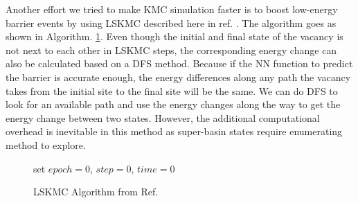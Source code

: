 Another effort we tried to make \ac{KMC} simulation faster is to boost low-energy barrier events by using \acf{LSKMC} described here in ref. \cite{fichthorn2013local}. The algorithm goes as shown in Algorithm. \ref{algo:lskmc}. Even though the initial and final state of the vacancy is not next to each other in \ac{LSKMC} steps, the corresponding energy change can also be calculated based on a \ac{DFS} method. Because if the \ac{NN} function to predict the barrier is accurate enough, the energy differences along any path the vacancy takes from the initial site to the final site will be the same. We can do \ac{DFS} to look for an available path and use the energy changes along the way to get the energy change between two states. However, the additional computational overhead is inevitable in this method as super-basin states require enumerating method to explore. 

\begin{figure}[!htb]
  \centering
  \begin{minipage}{.75\linewidth}
    \begin{algorithm}[H]
      \caption{\acf{LSKMC} Algorithm from  Ref. \cite{fichthorn2013local}}\label{algo:lskmc}
      \begin{algorithmic}[1]
        \State set $epoch = 0$, $step = 0$, $time = 0$
        \Else 
        \EndIf
        \EndIf
        
        \EndWhile
      \end{algorithmic}
    \end{algorithm}
  \end{minipage}
\end{figure}